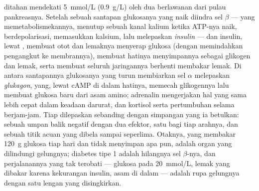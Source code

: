 \begin{proposition}\label{prop:b2:cell-signalling:glucose}
 ditahan mendekati \qty{5}{mmol/L} (\qty{0.9}{g/L})
oleh dua  berlawanan dari pulau pankreasnya. Setelah sebuah
santapan glukosanya yang naik diindra sel $\beta$ --- yang
memetabolismekannya, menutup sebuah kanal kalium ketika ATP-nya naik,
berdepolarisasi, memasukkan kalsium, lalu melepaskan \emph{insulin} ---
dan insulin, lewat , membuat otot dan
lemaknya menyerap glukosa (dengan memindahkan pengangkut ke
membrannya), membuat hatinya menyimpannya sebagai glikogen dan lemak,
serta membuat seluruh jaringannya berhenti membakar lemak. Di antara
santapannya glukosanya yang turun membiarkan sel $\alpha$ melepaskan
\emph{glukagon}, yang, lewat cAMP di dalam hatinya, memecah glikogennya
lalu membuat glukosa baru dari asam amino; adrenalin mengerjakan hal
yang sama lebih cepat dalam keadaan darurat, dan kortisol serta 
pertumbuhan selama berjam-jam. Tiap  dilepaskan sebanding
dengan simpangan yang ia betulkan: sebuah umpan balik negatif dengan
dua efektor, satu bagi tiap arahnya, dan sebuah titik acuan yang dibela
sampai seperlima. Otaknya, yang membakar \qty{120}{g} glukosa tiap hari
dan tidak menyimpan apa pun, adalah organ yang dilindungi gelungnya;
diabetes tipe 1 adalah hilangnya sel $\beta$-nya, dan perjalanannya
yang tak terobati --- glukosa pada \qty{20}{mmol/L}, lemak yang dibakar
karena kekurangan insulin, asam di dalam  --- adalah rupa
gelungnya dengan satu lengan yang disingkirkan.
\end{proposition}

